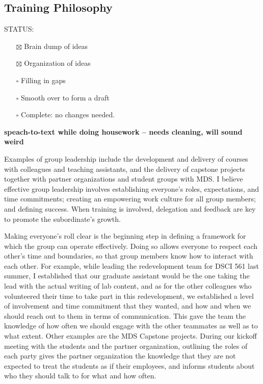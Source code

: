 \documentclass[]{article}
\providecommand{\tightlist}{%
  \setlength{\itemsep}{0pt}\setlength{\parskip}{0pt}}
\begin{document}
\hypertarget{training-philosophy}{%
\subsection{Training Philosophy}\label{training-philosophy}}

STATUS:

\begin{itemize}
\tightlist
\item[$\boxtimes$]
  Brain dump of ideas
\item[$\boxtimes$]
  Organization of ideas
\item[$\square$]
  Filling in gaps
\item[$\square$]
  Smooth over to form a draft
\item[$\square$]
  Complete: no changes needed.
\end{itemize}

\textbf{speach-to-text while doing housework -- needs cleaning, will sound weird}

Examples of group leadership include the development and delivery of courses with colleagues and teaching assistants, and the delivery of capstone projects together with partner organizations and student groups with MDS. I believe effective group leadership involves establishing everyone's roles, expectations, and time commitments; creating an empowering work culture for all group members; and defining success. When training is involved, delegation and feedback are key to promote the subordinate's growth.

Making everyone's roll clear is the beginning step in defining a framework for which the group can operate effectively. Doing so allows everyone to respect each other's time and boundaries, so that group members know how to interact with each other. For example, while leading the redevelopment team for DSCI 561 last summer, I established that our graduate assistant would be the one taking the lead with the actual writing of lab content, and as for the other colleagues who volunteered their time to take part in this redevelopment, we established a level of involvement and time commitment that they wanted, and how and when we should reach out to them in terms of communication. This gave the team the knowledge of how often we should engage with the other teammates as well as to what extent. Other examples are the MDS Capstone projects. During our kickoff meeting with the students and the partner organization, outlining the roles of each party gives the partner organization the knowledge that they are not expected to treat the students as if their employees, and informs students about who they should talk to for what and how often.
\end{document}
